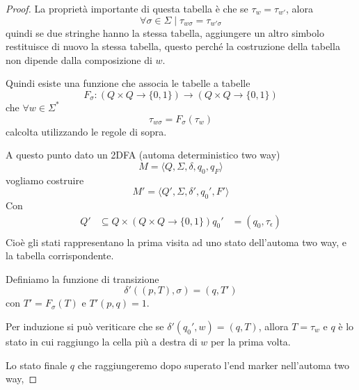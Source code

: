 \documentclass[12pt]{article}
\begin{document}
\begin{proof}
	La proprietà importante di questa tabella è che se $\tau_w = \tau_{w'}$, alora 
	$$\forall \sigma \in \Sigma \mid \tau_{w\sigma} = \tau_{w'\sigma} $$
	quindi se due stringhe hanno la stessa tabella, aggiungere un altro simbolo restituisce di nuovo la stessa tabella, questo perché la costruzione della tabella non dipende dalla composizione di $w$. %

	Quindi esiste una funzione che associa le tabelle a tabelle
	$$ F_\sigma : (Q \times Q \rightarrow \{0, 1\}) \rightarrow (Q \times Q \rightarrow \{0, 1\}) $$
	che $\forall w \in \Sigma^*$
	$$ \tau_{w\sigma} = F_\sigma(\tau_w) $$
	calcolta utilizzando le regole di sopra.

	A questo punto dato un 2DFA (automa deterministico two way)
	$$ M = \langle Q, \Sigma, \delta, q_0, q_F\rangle$$
	vogliamo costruire
	$$ M' = \langle Q', \Sigma, \delta', q_0', F' \rangle $$
	Con
	\begin{align*}
		Q' &\subseteq Q \times (Q \times Q \rightarrow \{0, 1\}) 
		q_0' &= (q_0, \tau_\epsilon ) \\
	\end{align*}
	Cioè gli stati rappresentano la prima visita ad uno stato dell'automa two way, e la tabella corrispondente.

	Definiamo la funzione di transizione
	$$ \delta'((p, T), \sigma) = (q, T') $$
	con $T' = F_\sigma(T)$ e $T'(p, q) = 1$.

	Per induzione si può veriticare che se $\delta'(q_0', w) = (q, T)$, allora $T = \tau_w$ e $q$ è lo stato in cui raggiungo la cella più a destra di $w$ per la prima volta.

	Lo stato finale $q$ che raggiungeremo dopo superato l'end marker nell'automa two way, 
\end{proof}
\end{document}
